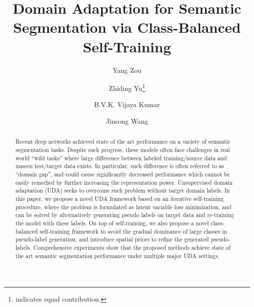 \documentclass[runningheads]{llncs}
\begin{document}
\title{Domain Adaptation for Semantic Segmentation via Class-Balanced Self-Training}

\author{
Yang Zou\and 
Zhiding Yu\thanks{indicates equal contribution.} \and
B.V.K. Vijaya Kumar \and 
Jinsong Wang
}



\maketitle
\begin{abstract}
Recent deep networks achieved state of the art performance on a variety of semantic segmentation tasks. Despite such progress, these models often face challenges in real world ``wild tasks'' where large difference between labeled training/source data and unseen test/target data exists. In particular, such difference is often referred to as ``domain gap'', and could cause significantly decreased performance which cannot be easily remedied by further increasing the representation power. Unsupervised domain adaptation (UDA) seeks to overcome such problem without target domain labels. In this paper, we propose a novel UDA framework based on an iterative self-training procedure, where the problem is formulated as latent variable loss minimization, and can be solved by alternatively generating pseudo labels on target data and re-training the model with these labels. On top of self-training, we also propose a novel class-balanced self-training framework to avoid the gradual dominance of large classes in pseudo-label generation, and introduce spatial priors to refine the generated pseudo-labels. Comprehensive experiments show that the proposed methods achieve state of the art semantic segmentation performance under multiple major UDA settings.
\end{abstract}
\end{document}
